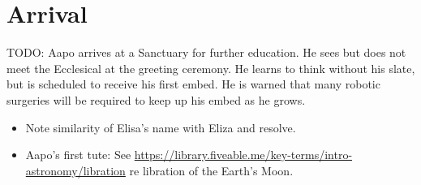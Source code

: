 %
%

\chapter{Arrival}

TODO: Aapo arrives at a Sanctuary for further education. He sees but does not meet the Ecclesical at the greeting ceremony. He learns to think without his slate, but is scheduled to receive his first embed. He is warned that many robotic surgeries will be required to keep up his embed as he grows.

\begin{itemize}
\item Note similarity of Elisa's name with Eliza and resolve.
\item Aapo's first tute: See \url{https://library.fiveable.me/key-terms/intro-astronomy/libration} re libration of the Earth's Moon.
\end{itemize}


\newpage
\thispagestyle{empty}
